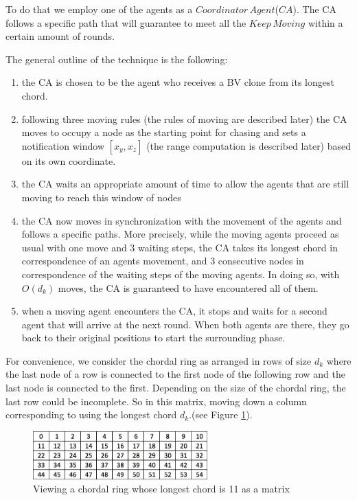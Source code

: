 
To do that we employ one of the agents as a  $Coordinator\,Agent$($CA$). The CA follows a specific path that will guarantee to meet all the $Keep\,Moving$ within a certain amount of rounds.


The general outline of the technique is the following:
\begin{enumerate}
\item the CA is chosen to be the agent who receives a BV clone from its longest chord. %
\item following three moving rules (the rules of moving are described later) the CA moves to occupy a  node as the starting point for chasing and sets  a notification window $[x_y,x_z]$ (the range computation is described later) based on its own coordinate. 
\item the CA waits an appropriate amount of time to allow the agents that are still moving to reach this window of nodes
\item the CA now moves in synchronization with the movement of the agents and follows a specific paths. 
More precisely, while the moving agents proceed as usual  with one move and 3 waiting steps, the CA   takes its longest chord in correspondence of an agents movement, and 3 consecutive nodes in correspondence of the waiting steps of the moving agents. In doing so, with $O(d_k)$ moves, the CA is guaranteed to have encountered  all of them.
\item when a moving agent encounters the CA, it stops and waits for a second agent that will arrive at the next round. When both agents are there, they go back to their original positions to start the surrounding phase.
\end{enumerate}


For   convenience,  we consider the chordal ring as arranged in rows of size $d_k$ where the last node of a row is connected to the first node of the following row and the last node is connected to the first. Depending on the size of the chordal ring, the last row could be incomplete. So in this matrix, moving down a column corresponding to using the longest chord $d_k$.(see Figure \ref{fig:matrix}). 
\begin{figure}[H]
  \centering  
  \includegraphics[width=0.6\textwidth]{figures/matrix.png}
  \caption{Viewing a chordal ring whose longest chord is 11 as a matrix}\label{fig:matrix}
\end{figure}

